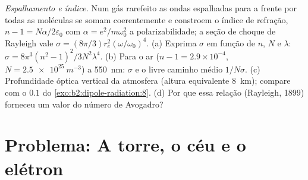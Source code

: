 \begin{exercise}[$\star\star\star$]\label{exo:b2:dipole-radiation:12}
\emph{Espalhamento e índice.} Num gás rarefeito as ondas espalhadas para a frente
por todas as moléculas se somam coerentemente e constroem o índice de refração,
$n - 1 = N\alpha/2\varepsilon_0$ com $\alpha = e^2/m\omega_0^2$ a polarizabilidade; a
seção de choque de Rayleigh vale $\sigma = (8\pi/3)r_e^2(\omega/\omega_0)^4$. (a) Exprima
$\sigma$ em função de $n$, $N$ e $\lambda$: $\sigma = 8\pi^3(n^2 - 1)^2/3N^2\lambda^4$. (b)
Para o ar ($n - 1 = 2.9 \times 10^{-4}$, $N = \qty{2.5e25}{m^{-3}}$) a \qty{550}{nm}:
$\sigma$ e o livre caminho médio $1/N\sigma$. (c) Profundidade óptica vertical da
atmosfera (altura equivalente \qty{8}{km}); compare com o $0.1$ do
\cref{exo:b2:dipole-radiation:8}. (d) Por que essa relação (Rayleigh,
1899) forneceu um valor do número de Avogadro?
\end{exercise}

\section{Problema: A torre, o céu e o elétron}

